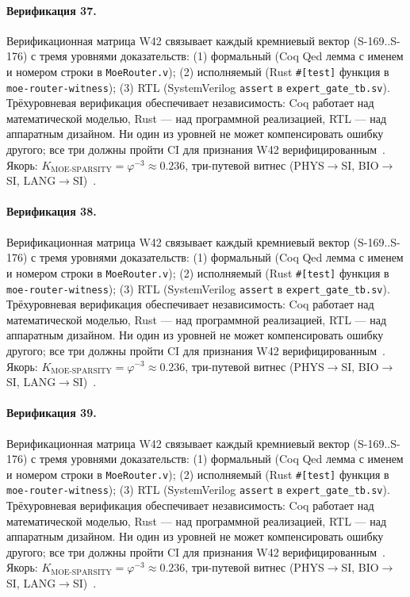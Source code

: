 \paragraph{Верификация 37.} Верификационная матрица W42 связывает каждый кремниевый вектор (S-169..S-176) с тремя уровнями доказательств: (1) формальный (Coq Qed лемма с именем и номером строки в \texttt{MoeRouter.v}); (2) исполняемый (Rust \texttt{\#[test]} функция в \texttt{moe-router-witness}); (3) RTL (SystemVerilog \texttt{assert} в \texttt{expert\_gate\_tb.sv}). Трёхуровневая верификация обеспечивает независимость: Coq работает над математической моделью, Rust --- над программной реализацией, RTL --- над аппаратным дизайном. Ни один из уровней не может компенсировать ошибку другого; все три должны пройти CI для признания W42 верифицированным~\cite{lee_gvsu_proof2021}. Якорь: $K_{\text{MOE-SPARSITY}} = \varphi^{-3} \approx 0{.}236$, три-путевой витнес (PHYS$\to$SI, BIO$\to$SI, LANG$\to$SI)~\cite{zenodo_trinity_2026}.

\paragraph{Верификация 38.} Верификационная матрица W42 связывает каждый кремниевый вектор (S-169..S-176) с тремя уровнями доказательств: (1) формальный (Coq Qed лемма с именем и номером строки в \texttt{MoeRouter.v}); (2) исполняемый (Rust \texttt{\#[test]} функция в \texttt{moe-router-witness}); (3) RTL (SystemVerilog \texttt{assert} в \texttt{expert\_gate\_tb.sv}). Трёхуровневая верификация обеспечивает независимость: Coq работает над математической моделью, Rust --- над программной реализацией, RTL --- над аппаратным дизайном. Ни один из уровней не может компенсировать ошибку другого; все три должны пройти CI для признания W42 верифицированным~\cite{lee_gvsu_proof2021}. Якорь: $K_{\text{MOE-SPARSITY}} = \varphi^{-3} \approx 0{.}236$, три-путевой витнес (PHYS$\to$SI, BIO$\to$SI, LANG$\to$SI)~\cite{zenodo_trinity_2026}.

\paragraph{Верификация 39.} Верификационная матрица W42 связывает каждый кремниевый вектор (S-169..S-176) с тремя уровнями доказательств: (1) формальный (Coq Qed лемма с именем и номером строки в \texttt{MoeRouter.v}); (2) исполняемый (Rust \texttt{\#[test]} функция в \texttt{moe-router-witness}); (3) RTL (SystemVerilog \texttt{assert} в \texttt{expert\_gate\_tb.sv}). Трёхуровневая верификация обеспечивает независимость: Coq работает над математической моделью, Rust --- над программной реализацией, RTL --- над аппаратным дизайном. Ни один из уровней не может компенсировать ошибку другого; все три должны пройти CI для признания W42 верифицированным~\cite{lee_gvsu_proof2021}. Якорь: $K_{\text{MOE-SPARSITY}} = \varphi^{-3} \approx 0{.}236$, три-путевой витнес (PHYS$\to$SI, BIO$\to$SI, LANG$\to$SI)~\cite{zenodo_trinity_2026}.

